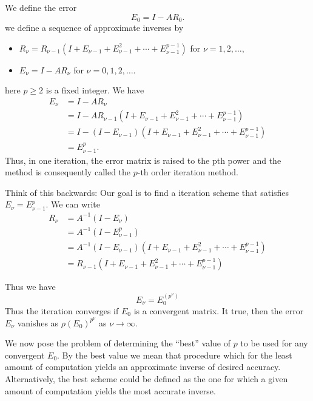 \documentclass[../main.tex]{subfiles}
\begin{document}
We define the error
\begin{equation*}
	E_0 = I - A R_0.
\end{equation*}
we define a sequence of approximate inverses by
\begin{itemize}
	\item $R_{\nu} = R_{\nu-1}(I + E_{\nu-1} + E_{\nu-1}^2 + \cdots + E_{\nu-1}^{p-1})$ for $\nu = 1, 2, \ldots$,
	\item $E_{\nu} = I - A R_{\nu}$ for $\nu = 0, 1, 2, \ldots$.
\end{itemize}
here $p \geq 2$ is a fixed integer. We have
\begin{equation*}
	\begin{aligned}
		E_{\nu} & = I - A R_{\nu} \\
		& = I - A R_{\nu-1} (I + E_{\nu-1} + E_{\nu-1}^2 + \cdots + E_{\nu-1}^{p-1}) \\
		& = I - (I - E_{\nu-1}) (I + E_{\nu-1} + E_{\nu-1}^2 + \cdots + E_{\nu-1}^{p-1}) \\
		& = E_{\nu-1}^p.
	\end{aligned}
\end{equation*}
Thus, in one iteration, the error matrix is raised to the pth power and the method is consequently called the $p$-th order iteration method.
\begin{remark}
	Think of this backwards: Our goal is to find a iteration scheme that satisfies $E_{\nu} = E_{\nu-1}^p$. We can write
	\begin{equation*}
		\begin{aligned}
			R_{\nu} & = A^{-1} (I - E_{\nu}) \\
			& = A^{-1} (I - E_{\nu-1}^p) \\
			& = A^{-1} (I - E_{\nu-1})(I + E_{\nu-1} + E_{\nu-1}^2 + \cdots + E_{\nu-1}^{p-1}) \\
			& = R_{\nu-1} (I + E_{\nu-1} + E_{\nu-1}^2 + \cdots + E_{\nu-1}^{p-1})
		\end{aligned}
	\end{equation*}
\end{remark}

Thus we have
\begin{equation}
	E_{\nu} = E_0^{(p^{\nu})}
\end{equation}
Thus the iteration converges if $E_0$ is a convergent matrix. It true, then the error $E_{\nu}$ vanishes as $\rho(E_0)^{p^{\nu}}$ as $\nu \to \infty$. 

We now pose the problem of determining the ``best'' value of $p$ to be used for any convergent $E_0$. By the best value we mean that procedure which for the least amount of computation yields an approximate inverse of desired accuracy. Alternatively, the best scheme could be defined as the one for which a given amount of computation yields the most accurate inverse.
\end{document}
